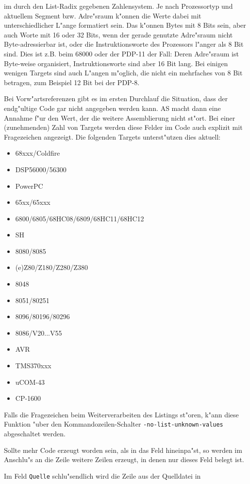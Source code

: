\documentclass[12pt,a4paper,twoside]{report}
\newcommand{\tty}[1]{{\tt #1}}
\newcommand{\asname}{AS}
\begin{document}
im durch den List-Radix gegebenen Zahlensystem.  Je nach Prozessortyp und
aktuellem Segment bzw. Adre"sraum k"onnen die Werte dabei mit unterschiedlicher
L"ange formatiert sein.  Das k"onnen Bytes mit 8 Bits sein, aber auch Worte
mit 16 oder 32 Bits, wenn der gerade genutzte Adre"sraum nicht Byte-adressierbar
ist, oder die Instruktionsworte des Prozessors l"anger als 8 Bit sind.  Dies
ist z.B. beim 68000 oder der PDP-11 der Fall: Deren Adre"sraum ist Byte-weise
organisiert, Instruktionsworte sind aber 16 Bit lang.  Bei einigen wenigen
Targets sind auch L"angen m"oglich, die nicht ein mehrfaches von 8 Bit betragen,
zum Beispiel 12 Bit bei der PDP-8.
\par
Bei Vorw"artsreferenzen gibt es im ersten Durchlauf die Situation, dass der
endg"ultige Code gar nicht angegeben werden kann. \asname{} macht dann eine
Annahme f"ur den Wert, der die weitere Assemblierung nicht st"ort.  Bei einer
(zunehmenden) Zahl von Targets werden diese Felder im Code auch explizit
mit Fragezeichen angezeigt.  Die folgenden Targets unterst"utzen dies aktuell:
\begin{itemize}
\item{68xxx/Coldfire}
\item{DSP56000/56300}
\item{PowerPC}
\item{65xx/65xxx}
\item{6800/6805/68HC08/6809/68HC11/68HC12}
\item{SH}
\item{8080/8085}
\item{(e)Z80/Z180/Z280/Z380}
\item{8048}
\item{8051/80251}
\item{8096/80196/80296}
\item{8086/V20...V55}
\item{AVR}
\item{TMS370xxx}
\item{uCOM-43}
\item{CP-1600}
\end{itemize}
Falls die Fragezeichen beim Weiterverarbeiten des Listings st"oren, k"ann
diese Funktion "uber den Kommandozeilen-Schalter \tty{-no-list-unknown-values}
abgeschaltet werden.
\par
Sollte mehr Code erzeugt worden sein, als in das Feld hineinpa"st, so
werden im Anschlu"s an die Zeile weitere Zeilen erzeugt, in denen nur
dieses Feld belegt ist.
\par
Im Feld \tty{Quelle} schlu"sendlich wird die Zeile aus der Quelldatei in
\end{document}
